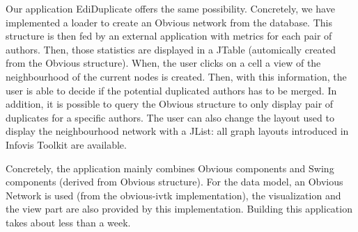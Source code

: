 Our application EdiDuplicate offers the same possibility. Concretely, we have implemented a loader to create an Obvious network from the  database. This structure is then fed by an external application with metrics for each pair of authors. Then, those statistics are displayed in a JTable (automically created from the Obvious structure). When, the user clicks on a cell a view of the neighbourhood of the current nodes is created. Then, with this information, the user is able to decide if the potential duplicated authors has to be merged. In addition, it is possible to query the Obvious structure to only display pair of duplicates for a specific authors. The user can also change the layout used to display the neighbourhood network with a JList: all graph layouts introduced in Infovis Toolkit are available. 

Concretely, the application mainly combines Obvious components and Swing components (derived from Obvious structure). For the data model, an Obvious Network is used (from the obvious-ivtk implementation), the visualization and the view part are also provided by this implementation. Building this application takes about less than a week.
